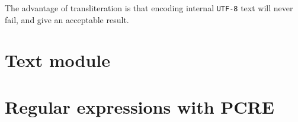 \documentclass{article}
\begin{document}
The advantage of transliteration is that encoding internal
\texttt{UTF-8} text will never fail, and give an acceptable result.

\section{Text module}


\section{Regular expressions with PCRE}
\end{document}
